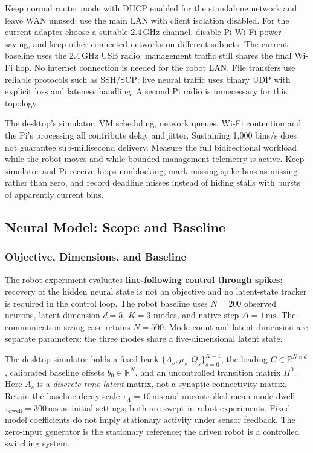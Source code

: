 Keep normal router mode with DHCP enabled for the standalone network and leave WAN unused; use the main LAN with client isolation disabled. For the current adapter choose a suitable 2.4\,GHz channel, disable Pi Wi-Fi power saving, and keep other connected networks on different subnets. The current baseline uses the 2.4\,GHz USB radio; management traffic still shares the final Wi-Fi hop. No internet connection is needed for the robot LAN. File transfers use reliable protocols such as SSH/SCP; live neural traffic uses binary UDP with explicit loss and lateness handling. A second Pi radio is unnecessary for this topology.

The desktop's simulator, VM scheduling, network queues, Wi-Fi contention and the Pi's processing all contribute delay and jitter. Sustaining 1,000 bins/s does not guarantee sub-millisecond delivery. Measure the full bidirectional workload while the robot moves and while bounded management telemetry is active. Keep simulator and Pi receive loops nonblocking, mark missing spike bins as missing rather than zero, and record deadline misses instead of hiding stalls with bursts of apparently current bins.

\subsection{Neural Model: Scope and Baseline}
\label{sec:controlled-neural}

\subsubsection{Objective, Dimensions, and Baseline}
The robot experiment evaluates \textbf{line-following control through spikes}; recovery of the hidden neural state is not an objective and no latent-state tracker is required in the control loop. The robot baseline uses $N=200$ observed neurons, latent dimension $d=5$, $K=3$ modes, and native step $\Delta=1\,\mathrm{ms}$. The communication sizing case retains $N=500$. Mode count and latent dimension are separate parameters: the three modes share a five-dimensional latent state.

The desktop simulator holds a fixed bank $\{A_s,\mu_s,Q_s\}_{s=0}^{K-1}$, the loading $C\in\mathbb{R}^{N\times d}$, calibrated baseline offsets $b_0\in\mathbb{R}^{N}$, and an uncontrolled transition matrix $\Pi^0$. Here $A_s$ is a \emph{discrete-time latent} matrix, not a synaptic connectivity matrix. Retain the baseline decay scale $\tau_A=10\,\mathrm{ms}$ and uncontrolled mean mode dwell $\tau_{\mathrm{dwell}}=300\,\mathrm{ms}$ as initial settings; both are swept in robot experiments. Fixed model coefficients do not imply stationary activity under sensor feedback. The zero-input generator is the stationary reference; the driven robot is a controlled switching system.


